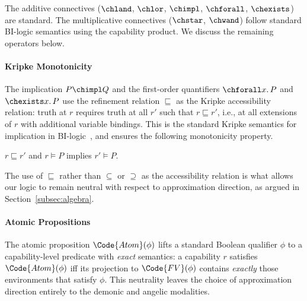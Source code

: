 The additive connectives ($\chland$, $\chlor$, $\chimpl$, $\chforall$,
$\chexists$) are standard.  The multiplicative connectives ($\chstar$,
$\chwand$) follow standard BI-logic semantics using the capability
product.  We discuss the remaining operators below.

\paragraph{Kripke Monotonicity}
The implication $P \chimpl Q$ and the first-order quantifiers
$\chforall x.\, P$ and $\chexists x.\, P$
use the refinement
relation $\sqsubseteq$ as the Kripke accessibility relation: truth at
$r$ requires truth at all $r'$ such that $r \sqsubseteq r'$, i.e., at all extensions
of $r$ with additional variable bindings.  This is the standard Kripke
semantics for implication in BI-logic~\cite{...}, and ensures the
following monotonicity property.

\begin{theorem}\label{thm:kripke-monotonicity}
  $r \sqsubseteq r'$ and $r \models P$ implies $r' \models P$.
\end{theorem}

The use of $\sqsubseteq$ rather than $\subseteq$ or $\supseteq$ as the
accessibility relation is what allows our logic to remain neutral with
respect to approximation direction, as argued in
Section~\ref{subsec:algebra}.

\paragraph{Atomic Propositions}
The atomic proposition $\Code{Atom}(\phi)$ lifts a standard Boolean
qualifier $\phi$ to a capability-level predicate with \emph{exact}
semantics: a capability $r$ satisfies $\Code{Atom}(\phi)$ iff its
projection to $\Code{FV}(\phi)$ contains \emph{exactly} those
environments that satisfy $\phi$.  This neutrality leaves the choice
of approximation direction entirely to the demonic and angelic
modalities.

